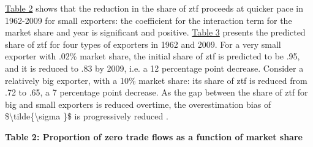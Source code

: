 \documentclass[12pt,twoside,a4paper,notitlepage]{article}
\begin{document}
{\hyperref[ref-005]{Table 2}} shows that the reduction in the share of ztf proceeds at quicker pace in 1962-2009 for small exporters: the coefficient for the interaction term for the market share and year is significant and positive. {\hyperref[ref-006]{Table 3}} presents the predicted share of ztf for four types of exporters in 1962 and 2009. For a very small exporter with .02\% market share, the initial share of ztf is predicted to be .95, and it is reduced to .83 by 2009, i.e. a 12 percentage point decrease. Consider a relatively big exporter, with a 10\% market share: its share of ztf is reduced from .72 to .65, a 7 percentage point decrease. As the gap between the share of ztf for big and small exporters is reduced overtime, the overestimation bias of \$\textbackslash tilde\{\textbackslash sigma \}\$ is progressively reduced%
 .

\textbf{ \label{ref-005}Table 2: Proportion of zero trade flows as a function of market share}
\end{document}
